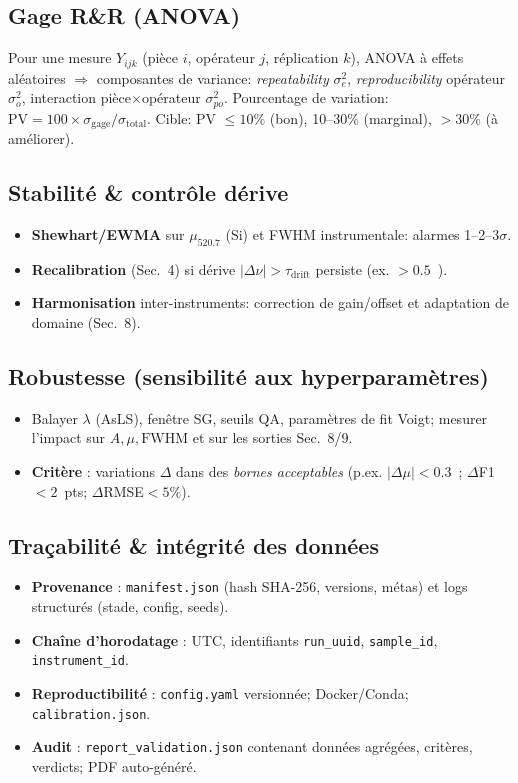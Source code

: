 \subsection{Gage R\&R (ANOVA)}
Pour une mesure $Y_{ijk}$ (pièce $i$, opérateur $j$, réplication $k$), ANOVA à effets aléatoires $\Rightarrow$ composantes de variance: \textit{repeatability} $\sigma^2_e$, \textit{reproducibility} opérateur $\sigma^2_o$, interaction pièce$\times$opérateur $\sigma^2_{po}$. Pourcentage de variation: $\mathrm{PV} = 100 \times \sigma_\text{gage}/\sigma_\text{total}$. Cible: PV $\le 10\%$ (bon), 10--30\% (marginal), $>30\%$ (à améliorer).

\subsection{Stabilité \& contrôle dérive}
\begin{itemize}[nosep]
\item \textbf{Shewhart/EWMA} sur $\mu_{520.7}$ (Si) et FWHM instrumentale: alarmes 1--2--3$\sigma$.
\item \textbf{Recalibration} (Sec.~4) si dérive $|\Delta \nu| > \tau_{\mathrm{drift}}$ persiste (ex. $>0.5$~\cm).
\item \textbf{Harmonisation} inter-instruments: correction de gain/offset et adaptation de domaine (Sec.~8).
\end{itemize}

\subsection{Robustesse (sensibilité aux hyperparamètres)}
\begin{itemize}[nosep]
\item Balayer $\lambda$ (AsLS), fenêtre SG, seuils QA, paramètres de fit Voigt; mesurer l'impact sur $A,\mu,\mathrm{FWHM}$ et sur les sorties Sec.~8/9.
\item \textbf{Critère} : variations $\Delta$ dans des \textit{bornes acceptables} (p.ex. $|\Delta \mu|<0.3$~\cm; $\Delta$F1$<2$~pts; $\Delta$RMSE$<5\%$).
\end{itemize}

\subsection{Traçabilité \& intégrité des données}
\begin{itemize}[nosep]
\item \textbf{Provenance} : \texttt{manifest.json} (hash SHA-256, versions, métas) et logs structurés (stade, config, seeds).
\item \textbf{Chaîne d'horodatage} : UTC, identifiants \texttt{run\_uuid}, \texttt{sample\_id}, \texttt{instrument\_id}.
\item \textbf{Reproductibilité} : \texttt{config.yaml} versionnée; Docker/Conda; \texttt{calibration.json}.
\item \textbf{Audit} : \texttt{report\_validation.json} contenant données agrégées, critères, verdicts; PDF auto-généré.
\end{itemize}

